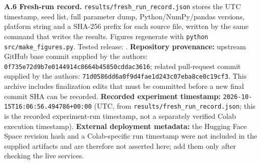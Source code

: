 \textbf{A.6 Fresh-run record.} \texttt{results/fresh\_run\_record.json} stores the UTC timestamp, seed list, full parameter dump, Python/NumPy/pandas versions, platform string and a SHA-256 prefix for each source file, written by the same command that writes the results. Figures regenerate with \texttt{python src/make\_figures.py}. Tested release: \TestedRelease. \textbf{Repository provenance:} upstream GitHub base commit supplied by the authors: \texttt{0f735e72d9b7e0144914c8664b45850cddac3616}; related pull-request commit supplied by the authors: \texttt{71d0586dd6a0f9d4fae1d243c07eba8ce0c19cf3}. This archive includes finalization edits that must be committed before a new final commit SHA can be recorded. \textbf{Recorded experiment timestamp:} \texttt{2026-10-15T16:06:56.494786+00:00} (UTC, from \texttt{results/fresh\_run\_record.json}; this is the recorded experiment-run timestamp, not a separately verified Colab execution timestamp). \textbf{External deployment metadata:} the Hugging Face Space revision hash and a Colab-specific run timestamp were not included in the supplied artifacts and are therefore not asserted here; add them only after checking the live services.

